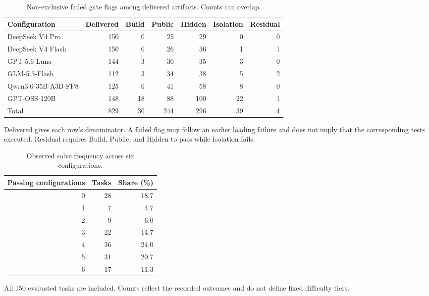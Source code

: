 \documentclass[acmsmall,screen,review,anonymous,nonacm]{acmart}
\begin{document}
\begin{table}[tbp]
 \caption{Non-exclusive failed gate flags among delivered artifacts. Counts can overlap.}
 \label{tab:independent-gates}
 \centering\small
 \setlength{\tabcolsep}{4pt}
 \renewcommand{\arraystretch}{1.12}
 \begin{tabularx}{\linewidth}{@{}Xrrrrrr@{}}
 \toprule
 Configuration & Delivered & Build & Public & Hidden & Isolation & Residual \\
 \midrule
 DeepSeek V4 Pro & 150 & 0 & 25 & 29 & 0 & 0 \\
 DeepSeek V4 Flash & 150 & 0 & 26 & 36 & 1 & 1 \\
 GPT-5.6 Luna & 144 & 3 & 30 & 35 & 3 & 0 \\
 GLM-5.3-Flash & 112 & 3 & 34 & 38 & 5 & 2 \\
 Qwen3.6-35B-A3B-FP8 & 125 & 6 & 41 & 58 & 8 & 0 \\
 GPT-OSS 120B & 148 & 18 & 88 & 100 & 22 & 1 \\
 \midrule
 Total & 829 & 30 & 244 & 296 & 39 & 4 \\
 \bottomrule
 \end{tabularx}
 \par\smallskip\begin{minipage}{\linewidth}\footnotesize
 Delivered gives each row's denominator. A failed flag may follow an earlier loading failure and does not imply that the corresponding tests executed. Residual requires Build, Public, and Hidden to pass while Isolation fails.
 \end{minipage}
\end{table}

\begin{table}[tbp]
 \caption{Observed solve frequency across six configurations.}
 \label{tab:difficulty}
 \centering\small
 \setlength{\tabcolsep}{4pt}
 \renewcommand{\arraystretch}{1.12}
 \begin{tabular}{@{}rrr@{}}
 \toprule
 Passing configurations & Tasks & Share (\%) \\
 \midrule
 0 & 28 & 18.7 \\
 1 & 7 & 4.7 \\
 2 & 9 & 6.0 \\
 3 & 22 & 14.7 \\
 4 & 36 & 24.0 \\
 5 & 31 & 20.7 \\
 6 & 17 & 11.3 \\
 \bottomrule
 \end{tabular}
 \par\smallskip\begin{minipage}{\linewidth}\footnotesize
 All 150 evaluated tasks are included. Counts reflect the recorded outcomes and do not define fixed difficulty tiers.
 \end{minipage}
\end{table}
\end{document}
